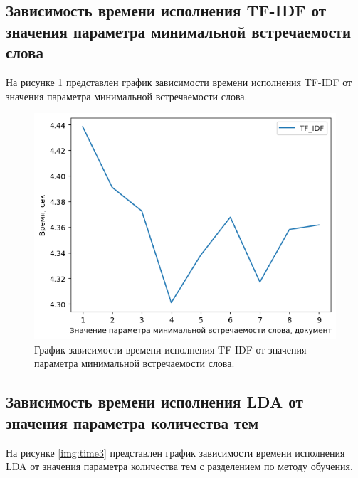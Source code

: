 \subsection{Зависимость времени исполнения TF-IDF от значения параметра минимальной встречаемости слова}

На рисунке \ref{img:time2} представлен график зависимости времени исполнения TF-IDF от значения параметра минимальной встречаемости слова.

\begin{figure}[H]
	\centering
	\includegraphics[width=\textwidth]{inc/timesMinDfTfIdf.png}
	\caption{ График зависимости времени исполнения TF-IDF от значения параметра минимальной встречаемости слова.}
	\label{img:time2}
\end{figure}

\subsection{Зависимость времени исполнения LDA от значения параметра количества тем}

На рисунке \ref{img:time3} представлен график зависимости времени исполнения LDA от значения параметра количества тем с разделением по методу обучения.


